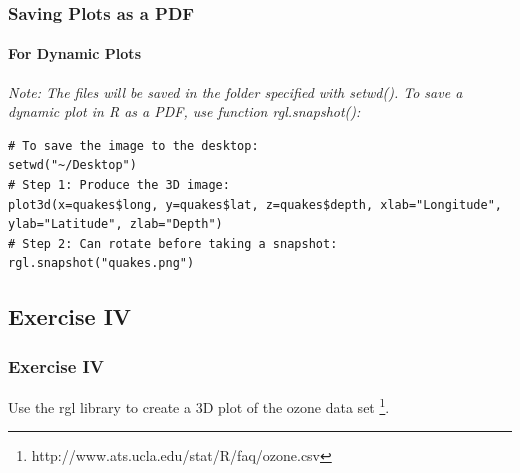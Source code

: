 \begin{frame}[fragile]
\frametitle{Saving Plots as a PDF}
\framesubtitle{For Dynamic Plots}

\itshape Note: \normalfont The files will be saved in the folder specified with \ttfamily setwd(). \normalfont
To save a dynamic plot in \ttfamily R \normalfont as a PDF, use function \ttfamily rgl.snapshot(): \normalfont

\begin{lstlisting}
# To save the image to the desktop:
setwd("~/Desktop")
# Step 1: Produce the 3D image:
plot3d(x=quakes$long, y=quakes$lat, z=quakes$depth, xlab="Longitude", ylab="Latitude", zlab="Depth")
# Step 2: Can rotate before taking a snapshot:
rgl.snapshot("quakes.png")
\end{lstlisting}

\end{frame}



\subsection{Exercise IV}
\begin{frame}
	\frametitle{Exercise IV}
	Use the \ttfamily rgl \normalfont library to create a 3D plot of the \ttfamily ozone \normalfont data set \footnote{\ttfamily http://www.ats.ucla.edu/stat/R/faq/ozone.csv\normalfont}.
\end{frame}